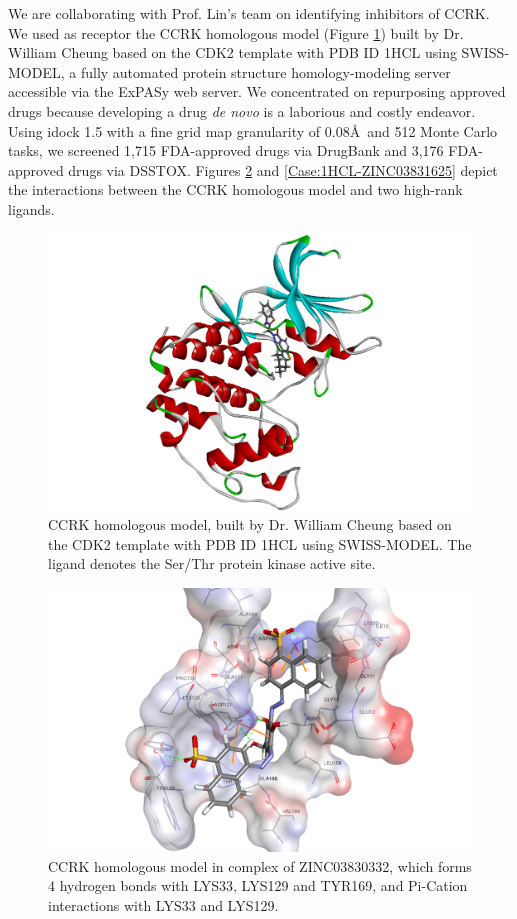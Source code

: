 We are collaborating with Prof. Lin's team on identifying inhibitors of CCRK. We used as receptor the CCRK homologous model (Figure \ref{Case:CCRKHomologousModel}) built by Dr. William Cheung based on the CDK2 template with PDB ID 1HCL \citep{1142} using SWISS-MODEL, a fully automated protein structure homology-modeling server accessible via the ExPASy web server. We concentrated on repurposing approved drugs \citep{944,1023} because developing a drug \textit{de novo} is a laborious and costly endeavor. Using idock 1.5 with a fine grid map granularity of 0.08\AA\ and 512 Monte Carlo tasks, we screened 1,715 FDA-approved drugs via DrugBank and 3,176 FDA-approved drugs via DSSTOX. Figures \ref{Case:1HCL-ZINC03830332} and \ref{Case:1HCL-ZINC03831625} depict the interactions between the CCRK homologous model and two high-rank ligands.

\begin{figure}
\centering
\includegraphics[width=\linewidth]{Case/CCRKHomologousModel.png}
\caption{CCRK homologous model, built by Dr. William Cheung based on the CDK2 template with PDB ID 1HCL \citep{1142} using SWISS-MODEL. The ligand denotes the Ser/Thr protein kinase active site.}
\label{Case:CCRKHomologousModel}
\end{figure}

\begin{figure}
\centering
\includegraphics[width=\linewidth]{Case/1HCL-ZINC03830332.png}
\caption{CCRK homologous model in complex of ZINC03830332, which forms 4 hydrogen bonds with LYS33, LYS129 and TYR169, and Pi-Cation interactions with LYS33 and LYS129.}
\label{Case:1HCL-ZINC03830332}
\end{figure}

